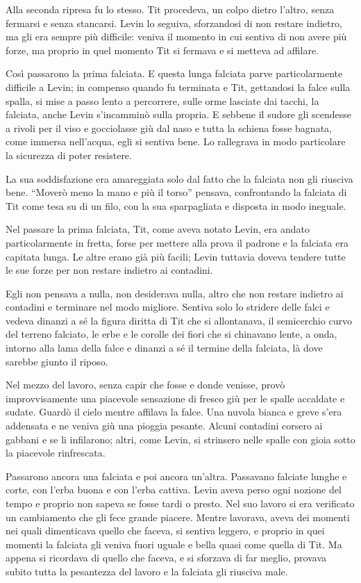 Alla seconda ripresa fu lo stesso. Tit procedeva, un colpo dietro l'altro, senza fermarsi e senza stancarsi. Levin lo seguiva, sforzandosi di non restare indietro, ma gli era sempre più difficile: veniva il momento in cui sentiva di non avere più forze, ma proprio in quel momento Tit si fermava e si metteva ad affilare. 

Così passarono la prima falciata. E questa lunga falciata parve particolarmente difficile a Levin; in compenso quando fu terminata e Tit, gettandosi la falce sulla spalla, si mise a passo lento a percorrere, sulle orme lasciate dai tacchi, la falciata, anche Levin s'incamminò sulla propria. E sebbene il sudore gli scendesse a rivoli per il viso e gocciolasse giù dal naso e tutta la schiena fosse bagnata, come immersa nell'acqua, egli si sentiva bene. Lo rallegrava in modo particolare la sicurezza di poter resistere. 

La sua soddisfazione era amareggiata solo dal fatto che la falciata non gli riusciva bene. ``Moverò meno la mano e più il torso'' pensava, confrontando la falciata di Tit come tesa su di un filo, con la sua sparpagliata e disposta in modo ineguale. 

Nel passare la prima falciata, Tit, come aveva notato Levin, era andato particolarmente in fretta, forse per mettere alla prova il padrone e la falciata era capitata lunga. Le altre erano già più facili; Levin tuttavia doveva tendere tutte le sue forze per non restare indietro ai contadini. 

Egli non pensava a nulla, non desiderava nulla, altro che non restare indietro ai contadini e terminare nel modo migliore. Sentiva solo lo stridere delle falci e vedeva dinanzi a sé la figura diritta di Tit che si allontanava, il semicerchio curvo del terreno falciato, le erbe e le corolle dei fiori che si chinavano lente, a onda, intorno alla lama della falce e dinanzi a sé il termine della falciata, là dove sarebbe giunto il riposo. 

Nel mezzo del lavoro, senza capir che fosse e donde venisse, provò improvvisamente una piacevole sensazione di fresco giù per le spalle accaldate e sudate. Guardò il cielo mentre affilava la falce. Una nuvola bianca e greve s'era addensata e ne veniva giù una pioggia pesante. Alcuni contadini corsero ai gabbani e se li infilarono; altri, come Levin, si strinsero nelle spalle con gioia sotto la piacevole rinfrescata. 

Passarono ancora una falciata e poi ancora un'altra. Passavano falciate lunghe e corte, con l'erba buona e con l'erba cattiva. Levin aveva perso ogni nozione del tempo e proprio non sapeva se fosse tardi o presto. Nel suo lavoro si era verificato un cambiamento che gli fece grande piacere. Mentre lavorava, aveva dei momenti nei quali dimenticava quello che faceva, si sentiva leggero, e proprio in quei momenti la falciata gli veniva fuori uguale e bella quasi come quella di Tit. Ma appena si ricordava di quello che faceva, e si sforzava di far meglio, provava subito tutta la pesantezza del lavoro e la falciata gli riusciva male. 

